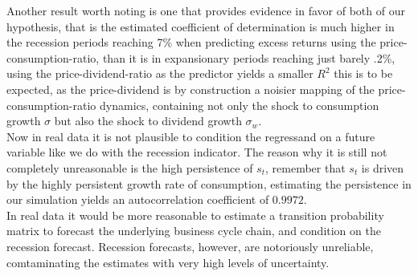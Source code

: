 Another result worth noting is one that provides evidence in favor of both of our hypothesis, that is the estimated coefficient of determination is much higher in the recession periods reaching 7\% when predicting excess returns using the price-consumption-ratio, than it is in expansionary periods reaching just barely .2\%, using the price-dividend-ratio as the predictor yields a smaller $R^2$ this is to be expected, as the price-dividend is by construction a noisier mapping of the price-consumption-ratio dynamics, containing not only the shock to consumption growth $\sigma$ but also the shock to dividend growth $\sigma_w$.\\

Now in real data it is not plausible to condition the regressand on a future variable like we do with the recession indicator. The reason why it is still not completely unreasonable is the high persistence of $s_t$, remember that $s_t$ is driven by the highly persistent growth rate of consumption, estimating the persistence in our simulation yields an autocorrelation coefficient of $0.9972$.\\
In real data it would be more reasonable to estimate a transition probability matrix to forecast the underlying business cycle chain, and condition on the recession forecast. Recession forecasts, however, are notoriously unreliable, comtaminating the estimates with very high levels of uncertainty.

